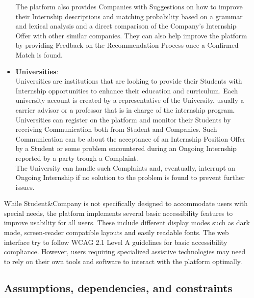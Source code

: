 \begin{itemize}
    The platform also provides Companies with Suggestions on how to improve their Internship descriptions and matching probability based on a grammar and lexical analysis and a direct comparison of the Company's Internship Offer with other similar companies. They can also help improve the platform by providing Feedback on the Recommendation Process once a Confirmed Match is found.
  \item \textbf{Universities}:\\
    Universities are institutions that are looking to provide their Students with Internship opportunities to enhance their education and curriculum. Each university account is created by a representative of the University, usually a carrier advisor or a professor that is in charge of the internship program.\\
    Universities can register on the platform and monitor their Students by receiving Communication both from Student and Companies. Such Communication can be about the acceptance of an Internship Position Offer by a Student or some problem encountered during an Ongoing Internship reported by a party trough a Complaint. \\
    The University can handle such Complaints and, eventually, interrupt an Ongoing Internship if no solution to the problem is found to prevent further issues.
\end{itemize}
While Student\&Company is not specifically designed to accommodate users with special needs, the platform implements several basic accessibility features to improve usability for all users. These include different display modes such as dark mode, screen-reader compatible layouts and easily readable fonts.
The web interface try to follow WCAG 2.1 Level A guidelines for basic accessibility compliance. However, users requiring specialized assistive technologies may need to rely on their own tools and software to interact with the platform optimally.\\

\subsection{Assumptions, dependencies, and constraints}

